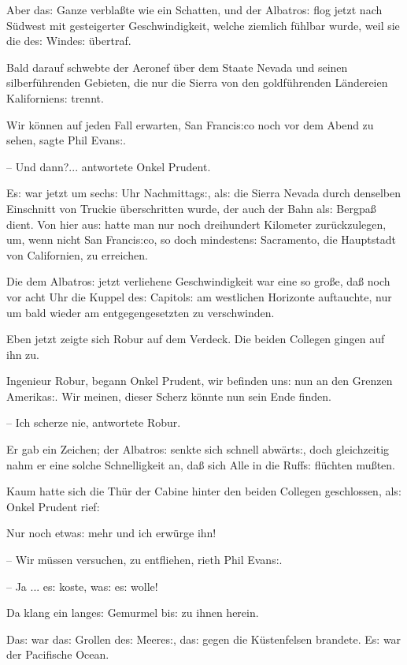 \documentclass[oneside,12pt]{book}
\newcommand{\s}{s:}
\begin{document}
Aber da{\s} Ganze verbla{\ss}te wie ein Schatten, und der
{\glqq}Albatro{\s}{\grqq} flog jetzt nach S\"udwest mit gesteigerter
Geschwindigkeit, welche ziemlich f\"uhlbar wurde, weil sie die de{\s}
Winde{\s} \"ubertraf.

Bald darauf schwebte der Aeronef \"uber dem Staate Nevada und seinen
silberf\"uhrenden Gebieten, die nur die Sierra von den
goldf\"uhrenden L\"andereien Kalifornien{\s} trennt.

{\glqq}Wir k\"onnen auf jeden Fall erwarten, San Franci{\s}co noch
vor dem Abend zu sehen, sagte Phil Evan{\s}.

-- Und dann?...{\grqq} antwortete Onkel Prudent.

E{\s} war jetzt um sech{\s} Uhr Nachmittag{\s}, al{\s} die Sierra
Nevada durch denselben Einschnitt von Truckie \"uberschritten wurde,
der auch der Bahn al{\s} Bergpa{\ss} dient. Von hier au{\s} hatte man
nur noch dreihundert Kilometer zur\"uckzulegen, um, wenn nicht San
Franci{\s}co, so doch mindesten{\s} Sacramento, die Hauptstadt von
Californien, zu erreichen.

Die dem {\glqq}Albatro{\s}{\grqq} jetzt verliehene Geschwindigkeit
war eine so gro{\ss}e, da{\ss} noch vor acht Uhr die Kuppel de{\s}
Capitol{\s} am westlichen Horizonte auftauchte, nur um bald wieder am
entgegengesetzten zu verschwinden.

Eben jetzt zeigte sich Robur auf dem Verdeck. Die beiden Collegen
gingen auf ihn zu.

{\glqq}Ingenieur Robur, begann Onkel Prudent, wir befinden un{\s} nun
an den Grenzen Amerika{\s}. Wir meinen, dieser Scherz k\"onnte nun
sein Ende finden.

-- Ich scherze nie,{\grqq} antwortete Robur.

Er gab ein Zeichen; der {\glqq}Albatro{\s}{\grqq} senkte sich schnell
abw\"art{\s}, doch gleichzeitig nahm er eine solche Schnelligkeit an,
da{\ss} sich Alle in die Ruff{\s} fl\"uchten mu{\ss}ten.

Kaum hatte sich die Th\"ur der Cabine hinter den beiden Collegen
geschlossen, al{\s} Onkel Prudent rief:

{\glqq}Nur noch etwa{\s} mehr und ich erw\"urge ihn!

-- Wir m\"ussen versuchen, zu entfliehen, rieth Phil Evan{\s}.

-- Ja ... e{\s} koste, wa{\s} e{\s} wolle!{\grqq}

Da klang ein lange{\s} Gemurmel bi{\s} zu ihnen herein.

Da{\s} war da{\s} Grollen de{\s} Meere{\s}, da{\s} gegen die
K\"ustenfelsen brandete. E{\s} war der Pacifische Ocean.
\end{document}
